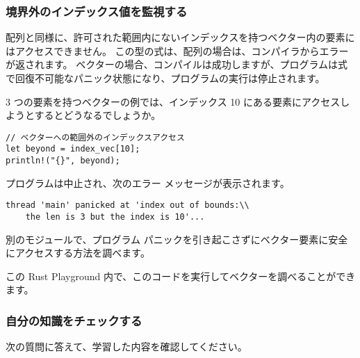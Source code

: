 \subsubsection{境界外のインデックス値を監視する}

配列と同様に、許可された範囲内にないインデックスを持つベクター内の要素にはアクセスできません。 この型の式は、配列の場合は、コンパイラからエラーが返されます。 ベクターの場合、コンパイルは成功しますが、プログラムは式で回復不可能なパニック状態になり、プログラムの実行は停止されます。

3 つの要素を持つベクターの例では、インデックス 10 にある要素にアクセスしようとするとどうなるでしょうか。


\begin{lstlisting}[numbers=none]
// ベクターへの範囲外のインデックスアクセス
let beyond = index_vec[10];
println!("{}", beyond);
\end{lstlisting}

プログラムは中止され、次のエラー メッセージが表示されます。

\begin{lstlisting}[numbers=none]
thread 'main' panicked at 'index out of bounds:\\
    the len is 3 but the index is 10'...
\end{lstlisting}

別のモジュールで、プログラム パニックを引き起こさずにベクター要素に安全にアクセスする方法を調べます。

この Rust Playground 内で、このコードを実行してベクターを調べることができます。


\subsubsection{自分の知識をチェックする}

次の質問に答えて、学習した内容を確認してください。


